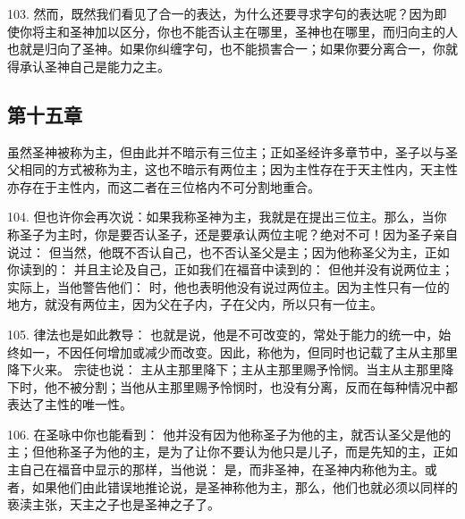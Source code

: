 103. 然而，既然我们看见了合一的表达，为什么还要寻求字句的表达呢？因为即使你将主和圣神加以区分，你也不能否认主在哪里，圣神也在哪里，而归向主的人也就是归向了圣神。如果你纠缠字句，也不能损害合一；如果你要分离合一，你就得承认圣神自己是能力之主。\par


\subsection{第十五章}

虽然圣神被称为主，但由此并不暗示有三位主；正如圣经许多章节中，圣子以与圣父相同的方式被称为主，这也不暗示有两位主；因为主性存在于天主性内，天主性亦存在于主性内，而这二者在三位格内不可分割地重合。\par

104. 但也许你会再次说：如果我称圣神为主，我就是在提出三位主。那么，当你称圣子为主时，你是要否认圣子，还是要承认两位主呢？绝对不可！因为圣子亲自说过：  但当然，他既不否认自己，也不否认圣父是主；因为他称圣父为主，正如你读到的：  并且主论及自己，正如我们在福音中读到的：  但他并没有说两位主；实际上，当他警告他们： 时，他也表明他没有说过两位主。因为主性只有一位的地方，就没有两位主，因为父在子内，子在父内，所以只有一位主。\par

105. 律法也是如此教导：  也就是说，他是不可改变的，常处于能力的统一中，始终如一，不因任何增加或减少而改变。因此，称他为，但同时也记载了主从主那里降下火来。 宗徒也说：  主从主那里降下；主从主那里赐予怜悯。当主从主那里降下时，他不被分割；当他从主那里赐予怜悯时，也没有分离，反而在每种情况中都表达了主性的唯一性。\par

106. 在圣咏中你也能看到： 他并没有因为他称圣子为他的主，就否认圣父是他的主；但他称圣子为他的主，是为了让你不要认为他只是儿子，而是先知的主，正如主自己在福音中显示的那样，当他说：  是，而非圣神，在圣神内称他为主。或者，如果他们由此错误地推论说，是圣神称他为主，那么，他们也就必须以同样的亵渎主张，天主之子也是圣神之子了。\par


